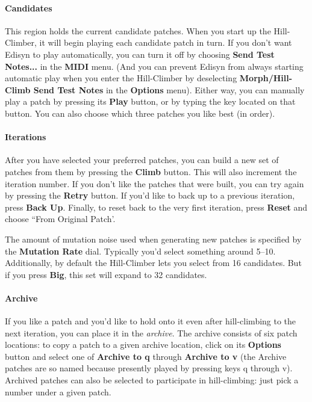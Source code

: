 \documentclass{article}
\begin{document}
\paragraph{Candidates} This region holds the current candidate patches. When you start up the Hill-Climber, it will begin playing each candidate patch in turn.  If you don't want Edisyn to play automatically, you can turn it off by choosing {\bf Send Test Notes...} in the {\bf MIDI} menu.  (And you can prevent Edisyn from always starting automatic play when you enter the Hill-Climber by deselecting {\bf Morph/Hill-Climb Send Test Notes} in the {\bf Options} menu).  Either way, you can manually play a patch by pressing its {\bf Play} button, or by typing the key located on that button.   You can also choose which three patches you like best (in order).

\paragraph{Iterations} After you have selected your preferred patches, you can build a new set of patches from them by pressing the {\bf Climb} button.  This will also increment the iteration number.  If you don't like the patches that were built, you can try again by pressing the {\bf Retry} button.  If you'd like to back up to a previous iteration, press {\bf Back Up}.  Finally, to reset back to the very first iteration, press {\bf Reset} and choose ``From Original Patch'.

The amount of mutation noise used when generating new patches is specified by the {\bf Mutation Rate} dial.  Typically you'd select something around 5--10.  Additionally, by default the Hill-Climber lets you select from 16 candidates.  But if you press {\bf Big}, this set will expand to 32 candidates.

\paragraph{Archive} If you like a patch and you'd like to hold onto it even after hill-climbing to the next iteration, you can place it in the {\it archive}.  The archive consists of six patch locations: to copy a patch to a given archive location, click on its {\bf Options} button and select one of {\bf Archive to q} through {\bf Archive to v} (the Archive patches are so named because presently played by pressing keys q through v).  Archived patches can also be selected to participate in hill-climbing: just pick a number under a given patch.
\end{document}
